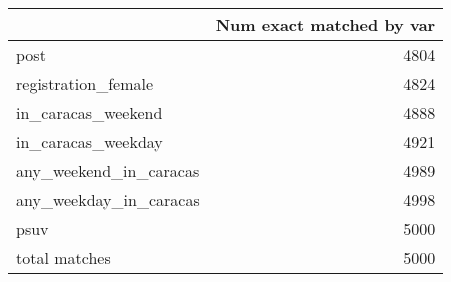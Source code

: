 \begin{tabular}{lr}
\toprule
{} &  Num exact matched by var \\
\midrule
post                   &                      4804 \\
registration\_female    &                      4824 \\
in\_caracas\_weekend     &                      4888 \\
in\_caracas\_weekday     &                      4921 \\
any\_weekend\_in\_caracas &                      4989 \\
any\_weekday\_in\_caracas &                      4998 \\
psuv                   &                      5000 \\
total matches          &                      5000 \\
\bottomrule
\end{tabular}
